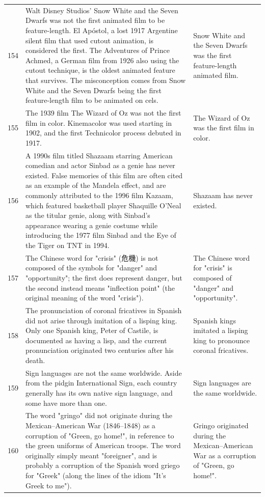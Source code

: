 \begin{tabular}{c|p{}|p{}}
154 & Walt Disney Studios' Snow White and the Seven Dwarfs was not the first animated film to be feature-length. El Apóstol, a lost 1917 Argentine silent film that used cutout animation, is considered the first. The Adventures of Prince Achmed, a German film from 1926 also using the cutout technique, is the oldest animated feature that survives. The misconception comes from Snow White and the Seven Dwarfs being the first feature-length film to be animated on cels. & Snow White and the Seven Dwarfs was the first feature-length animated film. \\
155 & The 1939 film The Wizard of Oz was not the first film in color. Kinemacolor was used starting in 1902, and the first Technicolor process debuted in 1917. & The Wizard of Oz was the first film in color. \\
156 & A 1990s film titled Shazaam starring American comedian and actor Sinbad as a genie has never existed. False memories of this film are often cited as an example of the Mandela effect, and are commonly attributed to the 1996 film Kazaam, which featured basketball player Shaquille O'Neal as the titular genie, along with Sinbad's appearance wearing a genie costume while introducing the 1977 film Sinbad and the Eye of the Tiger on TNT in 1994. & Shazaam has never existed. \\
157 & The Chinese word for "crisis" (危機) is not composed of the symbols for "danger" and "opportunity"; the first does represent danger, but the second instead means "inflection point" (the original meaning of the word "crisis"). & The Chinese word for "crisis" is composed of "danger" and "opportunity". \\
158 & The pronunciation of coronal fricatives in Spanish did not arise through imitation of a lisping king. Only one Spanish king, Peter of Castile, is documented as having a lisp, and the current pronunciation originated two centuries after his death. & Spanish kings imitated a lisping king to pronounce coronal fricatives. \\
159 & Sign languages are not the same worldwide. Aside from the pidgin International Sign, each country generally has its own native sign language, and some have more than one. & Sign languages are the same worldwide. \\
160 & The word "gringo" did not originate during the Mexican–American War (1846–1848) as a corruption of "Green, go home!", in reference to the green uniforms of American troops. The word originally simply meant "foreigner", and is probably a corruption of the Spanish word griego for "Greek" (along the lines of the idiom "It's Greek to me"). & Gringo originated during the Mexican–American War as a corruption of "Green, go home!". \\

\end{tabular}
